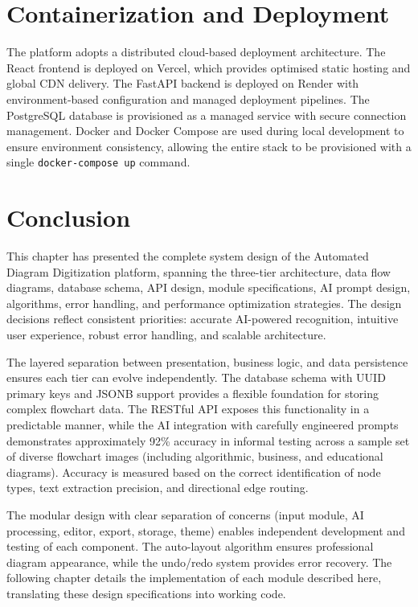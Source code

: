 
\section{Containerization and Deployment}
\label{sec:deployment}

\justifying
The platform adopts a distributed cloud-based deployment architecture. The React frontend is deployed on Vercel, which provides optimised static hosting and global CDN delivery. The FastAPI backend is deployed on Render with environment-based configuration and managed deployment pipelines. The PostgreSQL database is provisioned as a managed service with secure connection management. Docker and Docker Compose are used during local development to ensure environment consistency, allowing the entire stack to be provisioned with a single \texttt{docker-compose up} command.


\section{Conclusion}
\label{sec:ch4-conclusion}

\justifying
This chapter has presented the complete system design of the Automated Diagram Digitization platform, spanning the three-tier architecture, data flow diagrams, database schema, API design, module specifications, AI prompt design, algorithms, error handling, and performance optimization strategies. The design decisions reflect consistent priorities: accurate AI-powered recognition, intuitive user experience, robust error handling, and scalable architecture.

\justifying
The layered separation between presentation, business logic, and data persistence ensures each tier can evolve independently. The database schema with UUID primary keys and JSONB support provides a flexible foundation for storing complex flowchart data. The RESTful API exposes this functionality in a predictable manner, while the AI integration with carefully engineered prompts demonstrates approximately 92\% accuracy in informal testing across a sample set of diverse flowchart images (including algorithmic, business, and educational diagrams). Accuracy is measured based on the correct identification of node types, text extraction precision, and directional edge routing.

\justifying
The modular design with clear separation of concerns (input module, AI processing, editor, export, storage, theme) enables independent development and testing of each component. The auto-layout algorithm ensures professional diagram appearance, while the undo/redo system provides error recovery. The following chapter details the implementation of each module described here, translating these design specifications into working code.